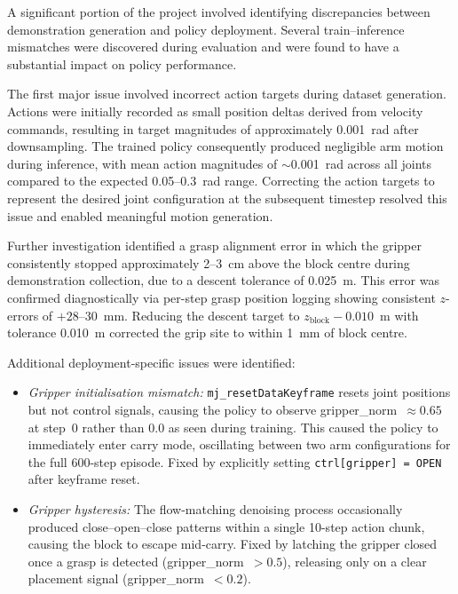 A significant portion of the project involved identifying discrepancies between
demonstration generation and policy deployment.
Several train--inference mismatches were discovered during evaluation and were found to
have a substantial impact on policy performance.

The first major issue involved incorrect action targets during dataset generation.
Actions were initially recorded as small position deltas derived from velocity commands,
resulting in target magnitudes of approximately 0.001~rad after downsampling.
The trained policy consequently produced negligible arm motion during inference,
with mean action magnitudes of $\sim$0.001~rad across all joints
compared to the expected 0.05--0.3~rad range.
Correcting the action targets to represent the desired joint configuration at the
subsequent timestep resolved this issue and enabled meaningful motion generation.

Further investigation identified a grasp alignment error in which the gripper
consistently stopped approximately 2--3~cm above the block centre during demonstration
collection, due to a descent tolerance of 0.025~m.
This error was confirmed diagnostically via per-step grasp position logging showing
consistent $z$-errors of $+28$--$30$~mm.
Reducing the descent target to $z_\text{block} - 0.010$~m with tolerance 0.010~m
corrected the grip site to within 1~mm of block centre.

Additional deployment-specific issues were identified:
\begin{itemize}
    \item \emph{Gripper initialisation mismatch:} \texttt{mj\_resetDataKeyframe} resets
    joint positions but not control signals, causing the policy to observe
    gripper\_norm~$\approx 0.65$ at step~0 rather than 0.0 as seen during training.
    This caused the policy to immediately enter carry mode, oscillating between two arm
    configurations for the full 600-step episode.
    Fixed by explicitly setting \texttt{ctrl[gripper] = OPEN} after keyframe reset.

    \item \emph{Gripper hysteresis:} The flow-matching denoising process occasionally
    produced close--open--close patterns within a single 10-step action chunk,
    causing the block to escape mid-carry.
    Fixed by latching the gripper closed once a grasp is detected
    (gripper\_norm~$> 0.5$), releasing only on a clear placement signal
    (gripper\_norm~$< 0.2$).
\end{itemize}

